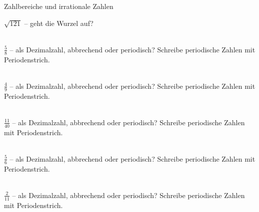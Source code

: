 \setcounter{aufgabe}{9}

\begin{aufgabe}{Zahlbereiche und irrationale Zahlen}
\begin{teile}
\teil $\sqrt{121}$ – geht die Wurzel auf? \\  \\ 
\end{teile}
\begin{teile}
\teil $\frac{5}{8}$ – als Dezimalzahl, abbrechend oder periodisch? Schreibe periodische Zahlen mit Periodenstrich. \\  \\  \leerfeld
\end{teile}
\begin{teile}
\teil $\frac{4}{9}$ – als Dezimalzahl, abbrechend oder periodisch? Schreibe periodische Zahlen mit Periodenstrich. \\  \\  \leerfeld
\end{teile}
\begin{teile}
\teil $\frac{11}{40}$ – als Dezimalzahl, abbrechend oder periodisch? Schreibe periodische Zahlen mit Periodenstrich. \\  \\  \leerfeld
\end{teile}
\begin{teile}
\teil $\frac{5}{6}$ – als Dezimalzahl, abbrechend oder periodisch? Schreibe periodische Zahlen mit Periodenstrich. \\  \\  \leerfeld
\end{teile}
\begin{teile}
\teil $\frac{2}{11}$ – als Dezimalzahl, abbrechend oder periodisch? Schreibe periodische Zahlen mit Periodenstrich. \\  \\  \leerfeld

\end{teile}
\end{aufgabe}
